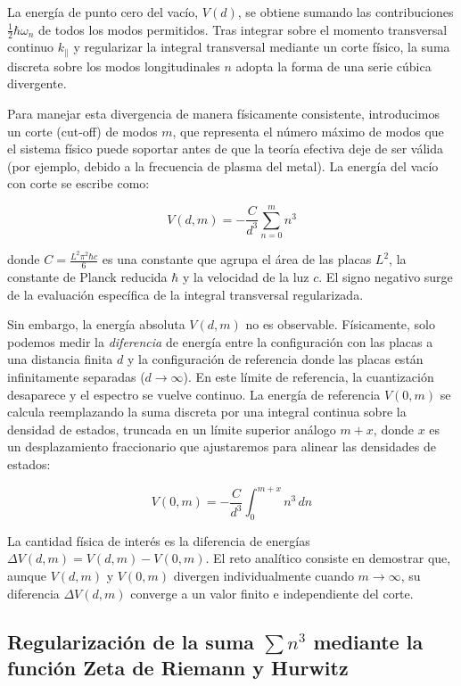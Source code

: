 La energía de punto cero del vacío, $V(d)$, se obtiene sumando las contribuciones $\frac{1}{2}\hbar \omega_n$ de todos los modos permitidos. Tras integrar sobre el momento transversal continuo $k_\parallel$ y regularizar la integral transversal mediante un corte físico, la suma discreta sobre los modos longitudinales $n$ adopta la forma de una serie cúbica divergente. 

Para manejar esta divergencia de manera físicamente consistente, introducimos un corte (cut-off) de modos $m$, que representa el número máximo de modos que el sistema físico puede soportar antes de que la teoría efectiva deje de ser válida (por ejemplo, debido a la frecuencia de plasma del metal). La energía del vacío con corte se escribe como:

$$ V(d, m) = - \frac{C}{d^3} \sum_{n=0}^{m} n^3 $$

donde $C = \frac{L^2 \pi^2 \hbar c}{6}$ es una constante que agrupa el área de las placas $L^2$, la constante de Planck reducida $\hbar$ y la velocidad de la luz $c$. El signo negativo surge de la evaluación específica de la integral transversal regularizada.

Sin embargo, la energía absoluta $V(d, m)$ no es observable. Físicamente, solo podemos medir la \textit{diferencia} de energía entre la configuración con las placas a una distancia finita $d$ y la configuración de referencia donde las placas están infinitamente separadas ($d \to \infty$). En este límite de referencia, la cuantización desaparece y el espectro se vuelve continuo. La energía de referencia $V(0, m)$ se calcula reemplazando la suma discreta por una integral continua sobre la densidad de estados, truncada en un límite superior análogo $m+x$, donde $x$ es un desplazamiento fraccionario que ajustaremos para alinear las densidades de estados:

$$ V(0, m) = - \frac{C}{d^3} \int_{0}^{m+x} n^3 \, dn $$

La cantidad física de interés es la diferencia de energías $\Delta V(d, m) = V(d, m) - V(0, m)$. El reto analítico consiste en demostrar que, aunque $V(d, m)$ y $V(0, m)$ divergen individualmente cuando $m \to \infty$, su diferencia $\Delta V(d, m)$ converge a un valor finito e independiente del corte.

\subsection{Regularización de la suma $\sum n^3$ mediante la función Zeta de Riemann y Hurwitz}

